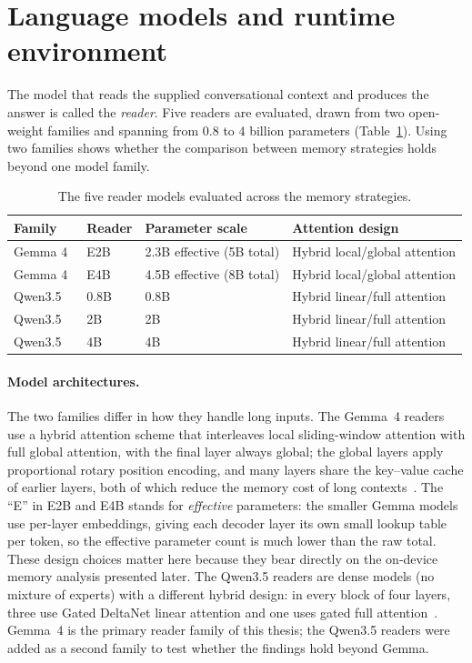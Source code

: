 \section{Language models and runtime environment}
\label{sec:models}

The model that reads the supplied conversational context and produces the answer is called the
\emph{reader}. Five readers are evaluated, drawn from two open-weight families and spanning from
0.8 to 4 billion parameters (Table~\ref{tab:readers}). Using two families shows whether the
comparison between memory strategies holds beyond one model family.

\begin{table}[t]
  \centering
  \begin{tabular}{llll}
    \toprule
    Family & Reader & Parameter scale & Attention design \\
    \midrule
    Gemma 4~\citep{gemma4}   & E2B  & 2.3B effective (5B total) & Hybrid local/global attention \\
    Gemma 4~\citep{gemma4}   & E4B  & 4.5B effective (8B total) & Hybrid local/global attention \\
    Qwen3.5~\citep{qwen35}   & 0.8B & 0.8B         & Hybrid linear/full attention \\
    Qwen3.5~\citep{qwen35}   & 2B   & 2B           & Hybrid linear/full attention \\
    Qwen3.5~\citep{qwen35}   & 4B   & 4B           & Hybrid linear/full attention \\
    \bottomrule
  \end{tabular}
  \caption{The five reader models evaluated across the memory strategies.}
  \label{tab:readers}
\end{table}

\paragraph{Model architectures.} The two families differ in how they handle long inputs. The
Gemma~4 readers use a hybrid attention scheme that interleaves local sliding-window attention with
full global attention, with the final layer always global; the global layers apply proportional
rotary position encoding, and many layers share the key--value cache of earlier layers, both of which reduce the
memory cost of long contexts~\citep{gemma4}. The ``E'' in E2B and E4B stands for \emph{effective} parameters: the smaller
Gemma models use per-layer embeddings, giving each decoder layer its own small lookup table per
token, so the effective parameter count is much lower than the raw total. These design choices matter
here because they bear directly on the on-device memory analysis presented later. The Qwen3.5 readers
are dense models (no mixture of experts) with a different hybrid design: in every block of four
layers, three use Gated DeltaNet linear attention and one uses gated full attention~\citep{qwen35}.
Gemma~4 is the primary reader family of this thesis; the Qwen3.5 readers were added as a second
family to test whether the findings hold beyond Gemma.

